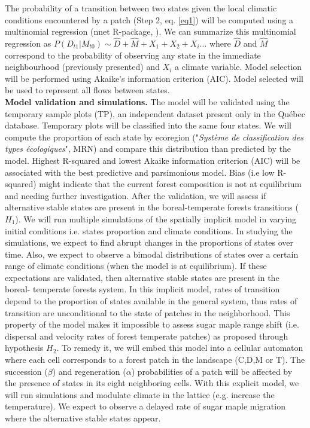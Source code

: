 The probability of a transition between two states given the local climatic
conditions encountered by a patch (Step 2, eq. \ref{eq1}) will be computed using a multinomial
regression (nnet R-package, \cite{Venables2002}). We can summarize this
multinomial regression as $P(D_{t1}|M_{t0}) \sim \hat{D} + \hat{M} +
X_1+X_2+X_i... $ where $\hat{D}$ and $\hat{M}$ correspond to the probability
of observing any state in the immediate neighbourhood (previously presented)
and $X_i$ a climate variable. Model selection will be performed using Akaike's
information criterion (AIC). Model selected will be used to represent all
flows between states.   \\

\textbf{Model validation and simulations.}  The model will be validated using
the temporary sample plots (TP), an independent dataset present only in the
Québec database. Temporary plots will be classified into the same four states.
We will compute the proportion of each state by ecoregion ("\textit{Système de
classification des types écologiques}", MRN) and compare this distribution than
predicted by the model.  Highest R-squared and lowest Akaike information
criterion (AIC) will be associated with the best predictive and parsimonious
model. Bias (i.e low R-squared) might indicate that the current forest
composition is not at equilibrium and needing further investigation. After the
validation, we will assess if alternative stable states are present in the
boreal-temperate forests transitions ($H_1$). We will run multiple simulations
of the spatially implicit model in varying initial conditions i.e. states
proportion and climate conditions. In studying the simulations, we expect to
find abrupt changes in the proportions of states over time. Also, we expect to
observe a bimodal distributions of states over a certain range of climate
conditions (when the model is at equilibrium). If these expectations are
validated, then alternative stable states are present in the boreal- temperate
forests system.  In this implicit model, rates of transition depend to the
proportion of states available in the general system, thus rates of transition
are unconditional to the state of patches in the neighborhood. This property of
the model makes it impossible to assess sugar maple range shift (i.e. dispersal
and velocity rates of forest temperate patches) as proposed through hypothesis
$H_2$. To remedy it, we will embed this model into a cellular automaton where each
cell corresponds to a forest patch in the landscape (C,D,M or T). The succession
($\beta$) and regeneration ($\alpha$) probabilities of a patch will be 
affected by the presence of states in its eight neighboring cells.  With this
explicit model, we will run simulations and modulate climate in the lattice
(e.g. increase the temperature). We expect to observe a delayed rate of sugar maple
migration where the alternative stable states
appear.


\clearpage


